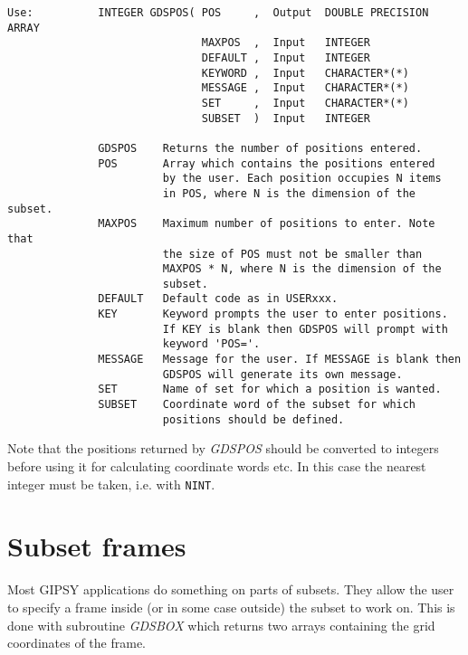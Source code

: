 \begin{verbatim}
Use:          INTEGER GDSPOS( POS     ,  Output  DOUBLE PRECISION ARRAY
                              MAXPOS  ,  Input   INTEGER
                              DEFAULT ,  Input   INTEGER
                              KEYWORD ,  Input   CHARACTER*(*)
                              MESSAGE ,  Input   CHARACTER*(*)
                              SET     ,  Input   CHARACTER*(*)
                              SUBSET  )  Input   INTEGER

              GDSPOS    Returns the number of positions entered.
              POS       Array which contains the positions entered
                        by the user. Each position occupies N items
                        in POS, where N is the dimension of the subset.
              MAXPOS    Maximum number of positions to enter. Note that
                        the size of POS must not be smaller than
                        MAXPOS * N, where N is the dimension of the
                        subset.
              DEFAULT   Default code as in USERxxx.
              KEY       Keyword prompts the user to enter positions.
                        If KEY is blank then GDSPOS will prompt with
                        keyword 'POS='.
              MESSAGE   Message for the user. If MESSAGE is blank then
                        GDSPOS will generate its own message.
              SET       Name of set for which a position is wanted.
              SUBSET    Coordinate word of the subset for which
                        positions should be defined.
\end{verbatim}

Note that the positions returned by {\sl GDSPOS\/} should be converted
to integers before using it for calculating coordinate words etc.  In
this case the nearest integer must be taken, i.e.  with {\tt NINT}.

\section{Subset frames}

Most GIPSY applications do something on parts of subsets.  They allow
the user to specify a frame inside (or in some case outside) the subset
to work on.  This is done with subroutine {\sl GDSBOX\/} which returns
two arrays containing the grid coordinates of the frame.

